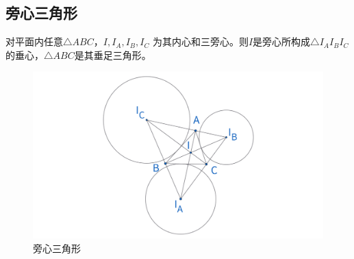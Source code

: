 \newpage 
\subsection{旁心三角形}
\begin{proposition}[旁心三角形]
    对平面内任意$\triangle ABC$，$I, I_A,I_B,I_C$ 为其内心和三旁心。则$I$是旁心所构成$\triangle I_AI_BI_C$ 的垂心，$\triangle ABC$是其垂足三角形。
\end{proposition}

\begin{figure}[H]
    \centering
    \includegraphics[width=\linewidth]{figures/三角形五心/旁心三角形.png}
    \caption{旁心三角形}
\end{figure}





